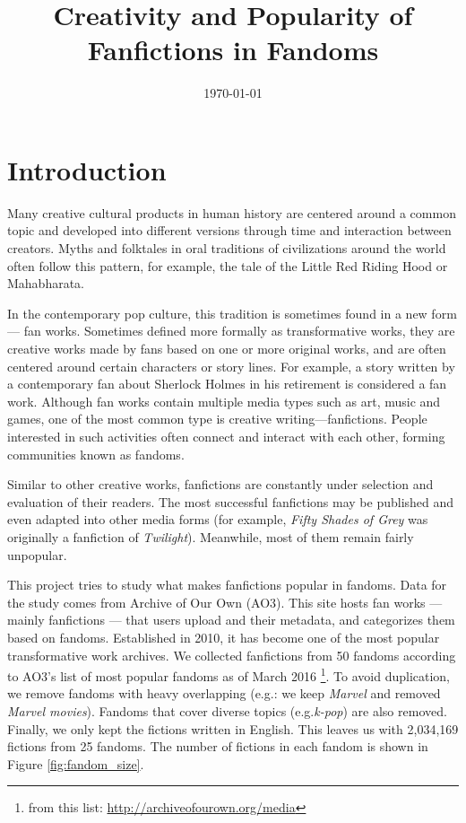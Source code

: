 \documentclass[11pt]{article} %
\begin{document}

\title{Creativity and Popularity of Fanfictions in Fandoms} %
\date{\today}
\maketitle %

\section{Introduction} %
\label{sec:introduction}
Many creative cultural products in human history are centered around a common topic and developed into different versions through time and interaction between creators. Myths and folktales in oral traditions of civilizations around the world often follow this pattern, for example, the tale of the Little Red Riding Hood or Mahabharata. 

In the contemporary pop culture, this tradition is sometimes found in a new form --- fan works. Sometimes defined more formally as transformative works, they are creative works made by fans based on one or more original works, and are often centered around certain characters or story lines\cite{wiki:transf_work}. For example, a story written by a contemporary fan about Sherlock Holmes in his retirement is considered a fan work. Although fan works contain multiple media types such as art, music and games, one of the most common type is creative writing---fanfictions. People interested in such activities often 
connect and interact with each other, forming communities known as fandoms\cite{wiki:fandom}.

Similar to other creative works, fanfictions are constantly under selection and evaluation of their readers. The most successful fanfictions may be published and even adapted into other media forms (for example, \emph{Fifty Shades of Grey} was originally a fanfiction of \emph{Twilight}). Meanwhile, most of them remain fairly unpopular.

This project tries to study what makes fanfictions popular in fandoms. Data for the study comes from Archive of Our Own (AO3). This site hosts fan works --- mainly fanfictions --- that users upload and their metadata, and categorizes them based on fandoms. Established in 2010, it has become one of the most popular transformative work archives. We collected fanfictions from 50 fandoms according to AO3's list of most popular fandoms as of March 2016 \footnote{from this list: \url{http://archiveofourown.org/media}}. To avoid duplication, we remove fandoms with heavy overlapping (e.g.: we keep \emph{Marvel} and removed \emph{Marvel movies}). Fandoms that cover diverse topics (e.g.\emph{k-pop}) are also removed. Finally, we only kept the fictions written in English. This leaves us with 2,034,169 fictions from 25 fandoms. The number of fictions in each fandom is shown in Figure \ref{fig:fandom_size}.
\end{document}
